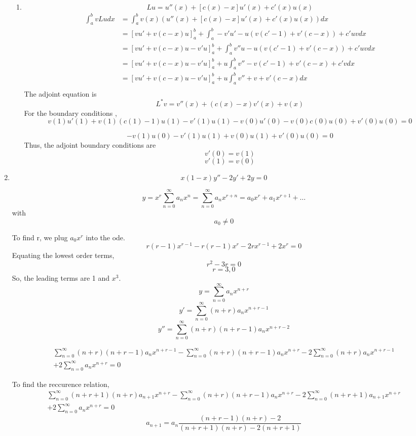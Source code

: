 \documentclass[letterpaper,12pt]{article}
\begin{document}
\begin{enumerate}
\begin{enumerate}
\item
\[Lu = u''(x)+[c(x)-x]u'(x)+c'(x)u(x)\]
\begin{align*} \int_a^b v L u  dx & =   \int_a^b v(x) (u''(x)+[c(x)-x]u'(x)+c'(x)u(x) ) dx \\
& = [vu' + v(c-x)u ]_a^b+ \int_a^b  - v' u' -u(v(c'-1)+v'(c-x)) + c' u v dx \\
& = [vu' + v(c-x)u -v'u ]_a^b+ \int_a^b  v'' u -u(v(c'-1)+v'(c-x)) + c' u v dx \\
& = [vu' + v(c-x)u -v'u ]_a^b+ u \int_a^b  v''  -v(c'-1)+v'(c-x) + c'  v dx \\
& = [vu' + v(c-x)u -v'u ]_a^b+ u \int_a^b  v''  +v +v'(c-x)  dx \\
\end{align*}
The adjoint equation is
\[L^* v = v''(x) +(c(x)-x)v'(x)+v(x)\]
For the boundary conditions ,
\[v(1) u'(1)+v(1)(c(1)-1)u(1)-v'(1)u(1) - v(0) u'(0)- v(0)c(0)u(0)+v'(0)u(0)=0\]

\[-v(1)u(0) -v'(1)u(1) + v(0) u(1)+v'(0)u(0)=0\]
Thus, the adjoint boundary conditions are
\[v'(0)=v(1)\]
\[v'(1)=v(0)\]
\end{enumerate}

\item
\[x(1-x)y''-2y'+2y=0\]

\[y =x^r\sum_{n=0}^\infty a_nx^n = \sum_{n=0}^\infty a_nx^{r+n}= a_0 x^r + a_1 x^{r+1} +\ldots\]
with
\[a_0\neq 0\]

To find r, we plug $a_0 x^r $ into the ode.
\[r(r-1)x^{r-1}-r(r-1)x^r-2rx^{r-1}+2x^r=0\]
Equating the lowest order terms,
\[r^2-3r=0\]
\[ r = 3,0\]
So, the leading terms are 1 and $x^3$.
\[y = \sum_{n=0}^\infty a_n x^{n+r} \]
\[y' = \sum_{n=0}^\infty (n+r) a_{n} x^{n+r-1}\]
\[y''= \sum_{n=0}^\infty (n+r)(n+r-1) a_{n} x^{n+r-2} \]

\begin{align*}
\sum_{n=0}^\infty (n+r)(n+r-1) a_{n} x^{n+r-1} - \sum_{n=0}^\infty (n+r)(n+r-1) a_{n} x^{n+r} - 2 \sum_{n=0}^\infty (n+r) a_{n} x^{n+r-1} \\ + 2 \sum_{n=0}^\infty a_{n} x^{n+r}  =0
\end{align*}

To find the reccurence relation,
\begin{align*}
\sum_{n=0}^\infty (n+r+1)(n+r) a_{n+1} x^{n+r} - \sum_{n=0}^\infty (n+r)(n+r-1) a_{n} x^{n+r} - 2 \sum_{n=0}^\infty (n+r+1) a_{n+1} x^{n+r} \\ + 2 \sum_{n=0}^\infty a_{n} x^{n+r}  =0
\end{align*}
\[ a_{n+1} = a_n \frac{(n+r-1)(n+r) -2}{(n+r+1)(n+r) - 2 (n+r+1)}\]


\end{enumerate}
\end{document}
